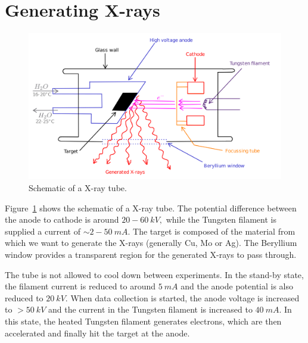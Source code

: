 \section{Generating X-rays}

\begin{figure}
	\centering
	\includegraphics[scale=0.14]{xray_tube.png}
	\caption{\label{fig:xray_tube}Schematic of a X-ray tube.}
\end{figure}

	Figure~\ref{fig:xray_tube} shows the schematic of a X-ray tube. The potential difference between the anode to cathode is around $20-60~\si{kV},$ while the Tungsten filament is supplied a current of $\sim 2-50~\si{mA}.$ The target is composed of the material from which we want to generate the X-rays (generally Cu, Mo or Ag). The Beryllium window provides a transparent region for the generated X-rays to pass through.
	
	The tube is not allowed to cool down between experiments. In the stand-by state, the filament current is reduced to around $\SI{5}{mA}$ and the anode potential is also reduced to $\SI{20}{kV}.$ When data collection is started, the anode voltage is increased to $>\SI{50}{kV}$ and the current in the Tungsten filament is increased to $\SI{40}{mA}.$ In this state, the heated Tungsten filament generates electrons, which are then accelerated and finally hit the target at the anode.

